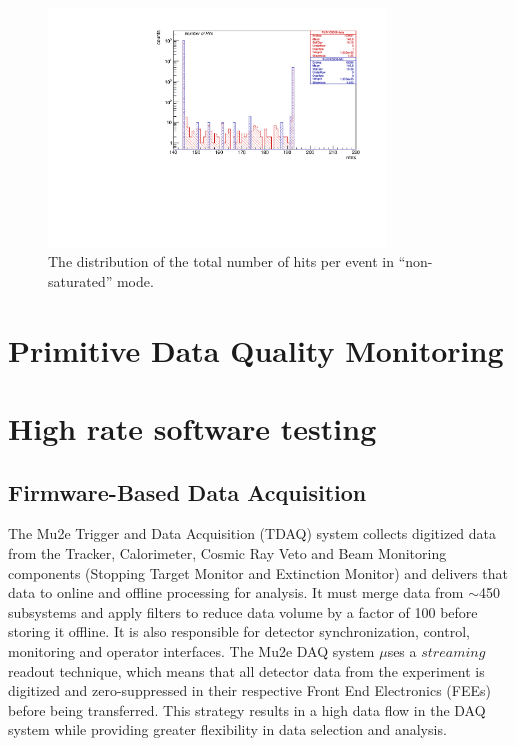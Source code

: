 \begin{figure}[!h]
\centering
\includegraphics[width =0.8\textwidth]{figures/pdf/figure_00009_nhits_105038.pdf}
\caption{
  The distribution of the total number of hits per event in ``non-saturated'' mode.
}
\label{fig:6}
\end{figure}
\section{Primitive Data Quality Monitoring}

\section{High rate software testing}
\subsection{Firmware-Based Data Acquisition}
The Mu2e Trigger and Data Acquisition (TDAQ) system collects digitized data from the Tracker, Calorimeter, Cosmic Ray Veto and Beam Monitoring components (Stopping Target Monitor and Extinction Monitor) and delivers that data to online and offline processing for analysis. It must merge data from $\sim$450 subsystems and apply filters to reduce data volume by a factor of 100 before storing it offline. It is also responsible for detector synchronization, control, monitoring and operator interfaces. The Mu2e DAQ system $\mu$ses a $streaming$ readout technique, which means that all detector data from the experiment is digitized and zero-suppressed in their respective Front End Electronics (FEEs) before being transferred. This strategy results in a high data flow in the DAQ system while providing greater flexibility in data selection and analysis.
